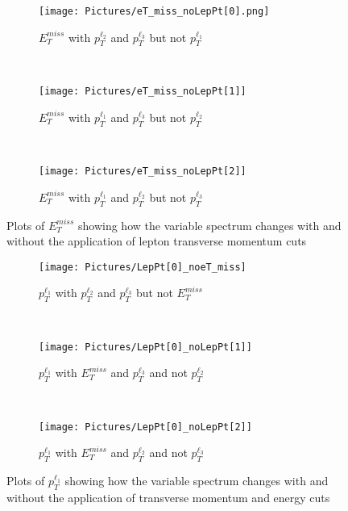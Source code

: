 \begin{figure}[H]
    \centering
    \begin{subfigure}[b]{0.48\textwidth}
        \centering
        \texttt{[image: Pictures/eT\_miss\_noLepPt[0].png]}
    \caption{$E_{T}^{miss}$ with $p_{T}^{\ell_{2}}$ and $p_{T}^{\ell_{3}}$ but not $p_{T}^{\ell_{1}}$}
    \end{subfigure}
    ~
    \begin{subfigure}[b]{0.48\textwidth}
        \centering
        \texttt{[image: Pictures/eT\_miss\_noLepPt[1]]}
    \caption{$E_{T}^{miss}$ with $p_{T}^{\ell_{1}}$ and $p_{T}^{\ell_{3}}$ but not $p_{T}^{\ell_{2}}$}    
        \end{subfigure}
    ~
    \begin{subfigure}[b]{0.48\textwidth}
        \centering
        \texttt{[image: Pictures/eT\_miss\_noLepPt[2]]}
    \caption{$E_{T}^{miss}$ with $p_{T}^{\ell_{1}}$ and $p_{T}^{\ell_{2}}$ but not $p_{T}^{\ell_{3}}$}    
        \end{subfigure}
\caption{Plots of $E_{T}^{miss}$ showing how the variable spectrum changes with and without the application of lepton transverse momentum cuts}
\label{fig:METN-1ON}
\end{figure}

\begin{figure}[H]
    \centering
    \begin{subfigure}[b]{0.48\textwidth}
        \centering
        \texttt{[image: Pictures/LepPt[0]\_noeT\_miss]}
    \caption{$p_{T}^{\ell_{1}}$ with $p_{T}^{\ell_{2}}$ and $p_{T}^{\ell_{3}}$ but not $E_{T}^{miss}$}
    \end{subfigure}
    ~
    \begin{subfigure}[b]{0.48\textwidth}
        \centering
        \texttt{[image: Pictures/LepPt[0]\_noLepPt[1]]}
    \caption{$p_{T}^{\ell_{1}}$ with $E_{T}^{miss}$ and $p_{T}^{\ell_{3}}$ and not $p_{T}^{\ell_{2}}$}    
        \end{subfigure}
    ~
    \begin{subfigure}[b]{0.48\textwidth}
        \centering
        \texttt{[image: Pictures/LepPt[0]\_noLepPt[2]]}
    \caption{$p_{T}^{\ell_{1}}$ with $E_{T}^{miss}$ and $p_{T}^{\ell_{2}}$ and not $p_{T}^{\ell_{3}}$}    
        \end{subfigure}
\caption{Plots of $p_{T}^{\ell_{1}}$ showing how the variable spectrum changes with and without the application of transverse momentum and energy cuts}
\label{fig:LepPt[0]N-1ON}
\end{figure}

